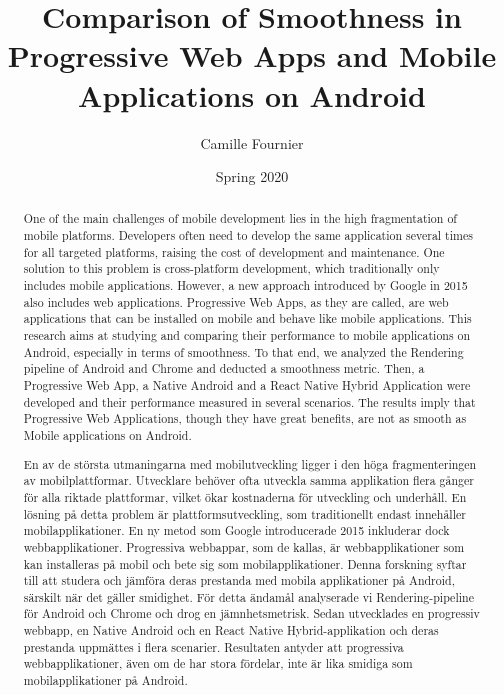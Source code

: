 \documentclass{kththesis}
\title{Comparison of Smoothness in Progressive Web Apps and Mobile Applications on Android}
\author{Camille Fournier}
\date{Spring 2020}
\begin{document}
\sloppy %


\frontmatter

\titlepage

\begin{abstract}    
  One of the main challenges of mobile development lies in the high fragmentation of mobile platforms. Developers often need to develop the same application several times for all targeted platforms, raising the cost of development and maintenance. One solution to this problem is cross-platform development, which traditionally only includes mobile applications. However, a new approach introduced by Google in 2015 also includes web applications. Progressive Web Apps, as they are called, are web applications that can be installed on mobile and behave like mobile applications. This research aims at studying and comparing their performance to mobile applications on Android, especially in terms of smoothness. To that end, we analyzed the Rendering pipeline of Android and Chrome and deducted a smoothness metric. Then, a Progressive Web App, a Native Android and a React Native Hybrid Application were developed and their performance measured in several scenarios. The results imply that Progressive Web Applications, though they have great benefits, are not as smooth as Mobile applications on Android.
\end{abstract}


\begin{otherlanguage}{swedish}
  \begin{abstract}
En av de största utmaningarna med mobilutveckling ligger i den höga fragmenteringen av mobilplattformar. Utvecklare behöver ofta utveckla samma applikation flera gånger för alla riktade plattformar, vilket ökar kostnaderna för utveckling och underhåll. En lösning på detta problem är plattformsutveckling, som traditionellt endast innehåller mobilapplikationer. En ny metod som Google introducerade 2015 inkluderar dock webbapplikationer. Progressiva webbappar, som de kallas, är webbapplikationer som kan installeras på mobil och bete sig som mobilapplikationer. Denna forskning syftar till att studera och jämföra deras prestanda med mobila applikationer på Android, särskilt när det gäller smidighet. För detta ändamål analyserade vi Rendering-pipeline för Android och Chrome och drog en jämnhetsmetrisk. Sedan utvecklades en progressiv webbapp, en Native Android och en React Native Hybrid-applikation och deras prestanda uppmättes i flera scenarier. Resultaten antyder att progressiva webbapplikationer, även om de har stora fördelar, inte är lika smidiga som mobilapplikationer på Android.
  \end{abstract}
\end{otherlanguage}
\end{document}
